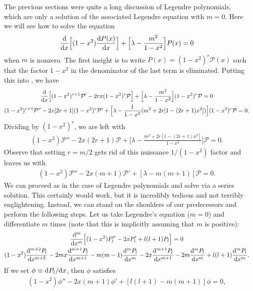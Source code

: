 The previous sections were quite a long discussion of Legendre polynomials, which are only a solution of the associated Legendre equation with $m=0$.
Here we will see how to solve the equation
\begin{eqnarray}
    \label{eq:associated-legendre-eq}
    \dv{x} \Big[ (1-x^2) \dv{P(x)}{x} \Big] + \Big[ \lambda - \frac{m^2}{1-x^2} \Big] P(x) = 0
\end{eqnarray}
when $m$ is nonzero.
The first insight is to write $P(x) = (1-x^2)^{r} \mathcal{P}(x)$ such that the factor $1-x^2$ in the denominator of the last term is eliminated.
Putting this into , we have
\begin{gather}
    \dv{x} \Big[ (1 - x^2)^{r+1} \mathcal{P}' - 2 r x(1 - x^2)^{r} \mathcal{P} \Big] + \Big[ \lambda - \frac{m^2}{1-x^2} \Big] (1-x^2)^{r} \mathcal{P} = 0 \nonumber \\
    (1-x^2)^{r+1}\mathcal{P}'' - 2x [ 2r + 1 ] (1-x^2)^{r} \mathcal{P}' + \Big[ \lambda - \frac{1}{1-x^2} ( m^2 + 2r[1 - (2r+1)x^2]) \Big] (1 - x^2)^{r} \mathcal{P} = 0
.\end{gather}
Dividing by $(1-x^2)^{r}$, we are left with
\begin{eqnarray}
    (1-x^2) \mathcal{P}'' - 2x(2r+1) \mathcal{P} + \Big[ \lambda - \frac{m^2 + 2r[ 1 - (2r + 1)x^2 ]}{1-x^2} \Big] \mathcal{P} = 0
.\end{eqnarray}
Observe that setting $r = m/2$ gets rid of this nuissance $1/(1-x^2)$ factor and leaves us with
\begin{eqnarray}
    (1-x^2) \mathcal{P}'' - 2x (m+1) \mathcal{P}' + [ \lambda - m(m+1) ] \mathcal{P} = 0
.\end{eqnarray}
We can proceed as in the case of Legendre polynomials and solve via a series solution.
This certainly would work, but it is incredibly tedious and not terribly englightening.
Instead, we can stand on the shoulders of our predecessors and perform the following steps.
Let us take Legendre's equation ($m = 0$) and differentiate $m$ times (note that this is implicitly assuming that $m$ is positive):
\begin{gather}
    \dv[m]{x} \Big[ (1-x^2) P_{l}'' - 2x P_{l}' + l(l+1)P_{l} \Big] = 0 \nonumber \\
    (1-x^2) \dv[m+2]{P_{l}}{x} - 2mx \dv[m+1]{P_{l}}{x} - m(m-1) \dv[m]{P_{l}}{x} - 2x \dv[m+1]{P_{l}}{x} - 2m \dv[m]{P_{l}}{x} + l(l+1) \dv[m]{P_{l}}{x}
.\end{gather}
If we set $\phi \equiv {\rm d} P_{l} / {\rm d}x$, then $\phi$ satisfies
\begin{eqnarray}
    (1-x^2) \phi'' - 2x(m+1) \phi' + [ l(l+1) - m(m+1) ] \phi = 0
,\end{eqnarray}
